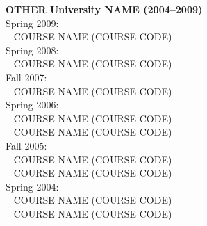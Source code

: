 \begin{table}[H]
  \centering
\begin{tcolorbox}[colback=yellow!10!white,colframe=csuOrange,title=\caption*{
  Table 1 -- continued from previous page.}]
\begin{tcolorbox}[tab2,tabularx={l}] %
{\bf OTHER University NAME (2004--2009)}  \\
 \toprule
%
Spring 2009:  \\
\quad\faCaretRight~  COURSE NAME (COURSE CODE) \\
%
Spring 2008:  \\
\quad\faCaretRight~  COURSE NAME (COURSE CODE) \\
%
Fall 2007:  \\
\quad\faCaretRight~  COURSE NAME (COURSE CODE) \\
%
Spring 2006:  \\
\quad\faCaretRight~  COURSE NAME (COURSE CODE) \\
\quad\faCaretRight~  COURSE NAME (COURSE CODE) \\
%
Fall 2005:  \\
\quad\faCaretRight~  COURSE NAME (COURSE CODE) \\
\quad\faCaretRight~  COURSE NAME (COURSE CODE) \\
 Spring 2004:  \\
 \quad\faCaretRight~  COURSE NAME (COURSE CODE) \\
 \quad\faCaretRight~  COURSE NAME (COURSE CODE) \\

%
\bottomrule
\end{tcolorbox}
\end{tcolorbox}
\label{Teaching_assignment_continued}
\end{table}
